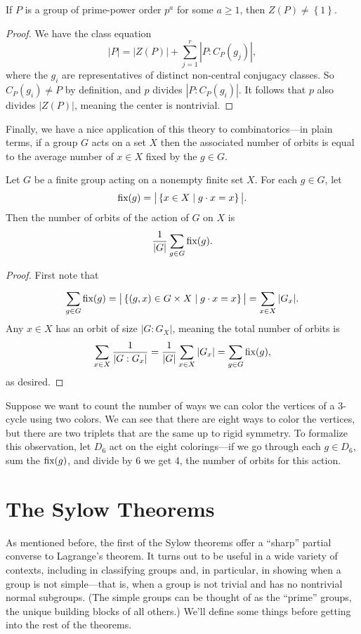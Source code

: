 \documentclass[../m171main.tex]{subfiles}
\begin{document}
\begin{theorem}[]
    If $P$ is a group of prime-power order $p^{a}$ for some $a \geq 1$, then $Z(P) \neq \left\{ 1 \right\}$.
\end{theorem}

\begin{proof}
    We have the class equation
    \[ |P| = |Z(P)| + \sum_{j=1}^{r} | P : C_P(g_j) |, \]
    where the $g_i$ are representatives of distinct non-central conjugacy classes.
    So $C_P(g_i) \neq P$ by definition, and $p$ divides $|P : C_P(g_i)|$.
    It follows that $p$ also divides $|Z(P)|$, meaning the center is nontrivial.
\end{proof}

Finally, we have a nice application of this theory to combinatorics---in plain terms, if a group $G$ acts on a set $X$ then the associated number of orbits is equal to the average number of $x \in X$ fixed by the $g \in G$.

\begin{theorem}   %
    Let $G$ be a finite group acting on a nonempty finite set $X$.
    For each $g \in G$, let
    \[ \textrm{fix}(g) = \big| \left\{ x \in X \;|\; g \cdot x = x \right\} \big|. \]
    Then the number of orbits of the action of $G$ on $X$ is
    \[ \frac{1}{|G|} \sum_{g \in G}^{} \textrm{fix}(g). \]
\end{theorem}

\begin{proof}
    First note that
    \[ \sum_{g \in G}^{} \textrm{fix}(g) = \big| \left\{ (g,x) \in G \times X \;|\; g \cdot x = x \right\} \big| = \sum_{x \in X}^{} |G_x|. \]
    Any $x \in X$ has an orbit of size $|G : G_X|$, meaning the total number of orbits is
    \[ \sum_{x \in X}^{} \frac{1}{|G : G_x|} = \frac{1}{|G|} \sum_{x \in X}^{} |G_x| = \sum_{g \in G}^{} \textrm{fix}(g), \]     %
    as desired.
\end{proof}

Suppose we want to count the number of ways we can color the vertices of a 3-cycle using two colors.
We can see that there are eight ways to color the vertices, but there are two triplets that are the same up to rigid symmetry.
To formalize this observation, let $D_6$ act on the eight colorings---if we go through each $g \in D_6$, sum the $\textrm{fix}(g)$, and divide by 6 we get 4, the number of orbits for this action.

\section{The Sylow Theorems}
As mentioned before, the first of the Sylow theorems offer a ``sharp'' partial converse to Lagrange's theorem.
It turns out to be useful in a wide variety of contexts, including in classifying groups and, in particular, in showing when a group is not simple---that is, when a group is not trivial and has no nontrivial normal subgroups.
(The simple groups can be thought of as the ``prime'' groups, the unique building blocks of all others.)
We'll define some things before getting into the rest of the theorems.
\end{document}

